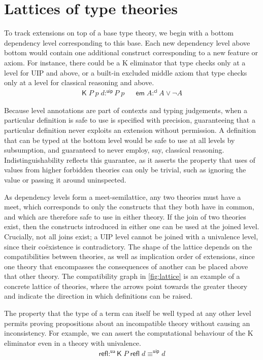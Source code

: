 \documentclass{article}
\newcommand{\kw}[1]{\mathsf{#1}}
\begin{document}
\section{Lattices of type theories} \label{sec:lattice}

To track extensions on top of a base type theory,
we begin with a bottom dependency level corresponding to this base.
Each new dependency level above bottom would contain one additional construct
corresponding to a new feature or axiom.
For instance, there could be a K eliminator that type checks
only at a level for UIP and above,
or a built-in excluded middle axiom that type checks
only at a level for classical reasoning and above.
%
\begin{align*}
  \kw{K} \; P \; p \; d :^{\kw{uip}} P \; p &&
  \kw{em} \; A :^{\kw{cl}} A \vee \neg A
\end{align*}
\vspace{-1.5\baselineskip}

Because level annotations are part of contexts and typing judgements,
when a particular definition is safe to use is specified with precision,
guaranteeing that a particular definition never exploits an extension without permission.
A definition that can be typed at the bottom level
would be safe to use at all levels by subsumption,
and guaranteed to never employ, say, classical reasoning.
Indistinguishability reflects this guarantee, as it asserts the property that
uses of values from higher forbidden theories can only be trivial,
such as ignoring the value or passing it around uninspected.

As dependency levels form a meet-semilattice,
any two theories must have a meet,
which corresponds to only the constructs that they both have in common,
and which are therefore safe to use in either theory.
If the join of two theories exist,
then the constructs introduced in either one can be used at the joined level.
Crucially, not all joins exist; a UIP level cannot be joined with a univalence level,
since their co\"existence is contradictory.
The shape of the lattice depends on the compatibilities between theories,
as well as implication order of extensions,
since one theory that encompasses the consequences of another
can be placed above that other theory.
The compatibility graph in \cref{fig:lattice}
is an example of a concrete lattice of theories,
where the arrows point towards the greater theory
and indicate the direction in which definitions can be raised.

The property that the type of a term can itself be well typed at any other level
permits proving propositions about an incompatible theory
without causing an inconsistency.
For example, we can assert the computational behaviour of the K eliminator
even in a theory with univalence.
%
\vspace{-\baselineskip}
\begin{align*}
  \kw{refl} :^{\kw{ua}} \kw{K} \; P \; \kw{refl} \; d \equiv^{\kw{uip}} d
\end{align*}
\vspace{-1.5\baselineskip}
\end{document}
